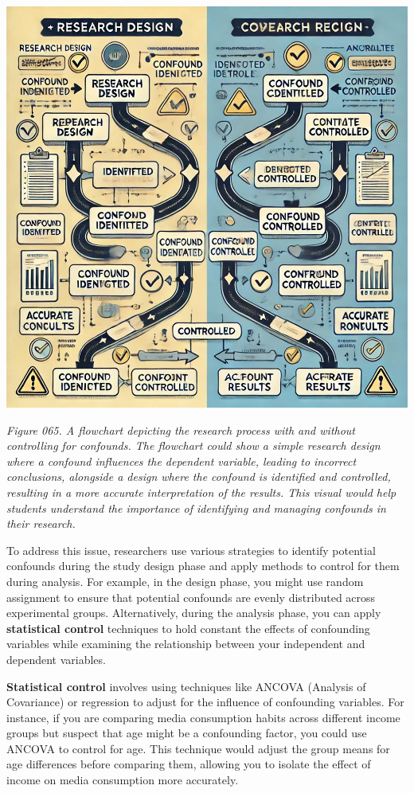 \documentclass[
]{book}
\begin{document}
\includegraphics[width=1\textwidth,height=\textheight]{images/fig065.jpg}

\emph{Figure 065. A flowchart depicting the research process with and without controlling for confounds. The flowchart could show a simple research design where a confound influences the dependent variable, leading to incorrect conclusions, alongside a design where the confound is identified and controlled, resulting in a more accurate interpretation of the results. This visual would help students understand the importance of identifying and managing confounds in their research.}

To address this issue, researchers use various strategies to identify potential confounds during the study design phase and apply methods to control for them during analysis. For example, in the design phase, you might use random assignment to ensure that potential confounds are evenly distributed across experimental groups. Alternatively, during the analysis phase, you can apply \textbf{statistical control} techniques to hold constant the effects of confounding variables while examining the relationship between your independent and dependent variables.

\textbf{Statistical control} involves using techniques like ANCOVA (Analysis of Covariance) or regression to adjust for the influence of confounding variables. For instance, if you are comparing media consumption habits across different income groups but suspect that age might be a confounding factor, you could use ANCOVA to control for age. This technique would adjust the group means for age differences before comparing them, allowing you to isolate the effect of income on media consumption more accurately.
\end{document}
